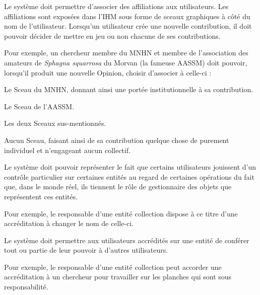 \startsubsubsection[title={Notion d'affiliation}]

\exig{}
Le système doit permettre d'associer des affiliations aux utilisateurs.
Les affiliations sont exposées dans l'IHM sous forme de sceaux graphiques à côté du nom de l'utilisateur.
Lorsqu'un utilisateur crée une nouvelle contribution, il doit pouvoir décider de mettre en jeu ou non chacune de ses contributions.

Pour exemple, un chercheur membre du MNHN et membre de l'association des amateurs de {\it Sphagna squarrosa} du Morvan (la fameuse AASSM) doit pouvoir, lorsqu'il produit une nouvelle Opinion, choisir d'associer à celle-ci :

\startitemize
	\item Le Sceau du MNHN, donnant ainsi une portée institutionnelle à sa contribution.
	\item Le Sceau de l'AASSM.
	\item Les deux Sceaux sus-mentionnés.
	\item Aucun Sceau, faisant ainsi de sa contribution quelque chose de purement individuel et n'engageant aucun collectif.
\stopitemize

\startsubsubsection[title={Notion d'accréditation}]

\exig{}
Le système doit pouvoir représenter le fait que certains utilisateurs jouissent d'un contrôle particulier sur certaines entités au regard de certaines opérations du fait que, dans le monde réel, ils tiennent le rôle de gestionnaire des objets que représentent ces entités.

Pour exemple, le responsable d'une entité collection dispose à ce titre d'une accréditation à changer le nom de celle-ci.

\exig{}
Le système doit permettre aux utilisateurs accrédités sur une entité de conférer tout ou partie de leur pouvoir à d'autres utilisateurs.

Pour exemple, le responsable d'une entité collection peut accorder une accréditation à un chercheur pour travailler sur les planches qui sont sous responsabilité.

\startsubsection[title={Représentation des contributions},reference:s:contributions]

